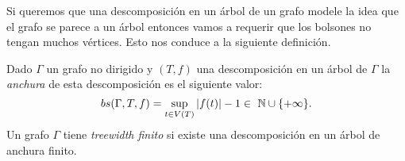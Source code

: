 \documentclass[tesis.tex]{subfiles}
\begin{document}
Si queremos que una descomposición en un árbol de un grafo modele la idea que el grafo se parece a un árbol entonces vamos a requerir que los 
bolsones no tengan muchos vértices. 
Esto nos conduce a la siguiente definición.



\begin{deff}
	Dado $\Gamma$ un grafo no dirigido y $(T,f)$ una descomposición en un árbol de $\Gamma$ la \emph{anchura} de esta descomposición es el siguiente valor:
	\begin{equation*}
		bs(\Gamma,T,f) = \sup_{t \in V(T)} |f(t)| - 1 \in \  \mathbb{N} \cup \{ +\infty \}.
	\end{equation*}
	Un grafo $\Gamma$ tiene \emph{treewidth finito} si existe una descomposición en un árbol de anchura finito.	
\end{deff}
\end{document}
